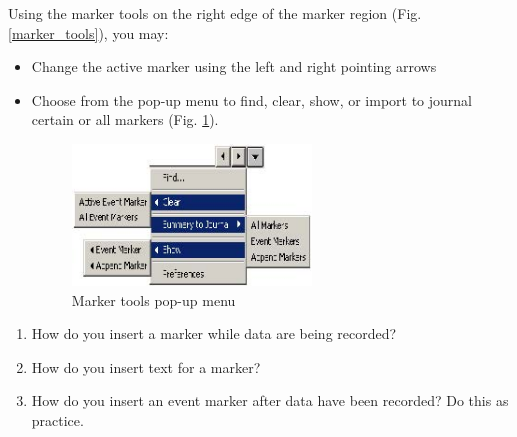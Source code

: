 \documentclass{article}
\begin{document}
Using the marker tools on the right edge of the marker region (Fig. \ref{marker_tools}), you may:
\begin{itemize}
	\item Change the active marker using the left and right pointing arrows
	\item Choose from the pop-up menu to find, clear, show, or import to journal certain or all markers (Fig. \ref{marker_menu}).
		\begin{figure}[h]
		\includegraphics[width=0.6\textwidth]{../images/BIOPAC_13.jpg}
		\centering
		\caption{Marker tools pop-up menu}
		\label{marker_menu}
		\end{figure}
\end{itemize}

\begin{enumerate}
	\item How do you insert a marker while data are being recorded?
	\item How do you insert text for a marker?
	\item How do you insert an event marker after data have been recorded? Do this as practice.
\end{enumerate}
\end{document}
